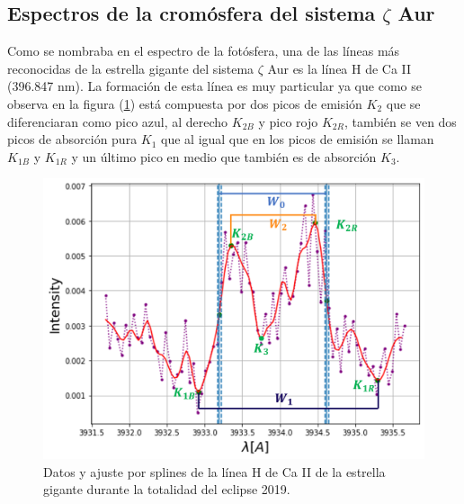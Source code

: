\documentclass[12pt,oneside,openany,letter]{book}
\begin{document}

\subsection*{Espectros de la cromósfera del  sistema $\zeta$ Aur}

\noindent Como se nombraba en el espectro de la fotósfera, una de las líneas más reconocidas de la estrella gigante del sistema $\zeta$ Aur es la línea H de Ca II (396.847 nm). La formación de esta línea es muy particular ya que como se observa en la figura (\ref{fig:lineaCaii}) está compuesta por dos picos de emisión $K_2$ que se diferenciaran como pico azul, al derecho $K_{2B}$ y pico rojo $K_{2R}$, también se ven dos picos de absorción pura $K_1$ que al igual que en los picos de emisión se llaman $K_{1B}$ y $K_{1R}$ y un último pico en medio que también es de absorción $K_3$.

\begin{figure}[h]
    \centering
    \includegraphics[width=0.8\linewidth]{Images/lineaCaii.png}
    \caption{Datos y ajuste por splines de la línea H de Ca II de la estrella gigante durante la totalidad del eclipse 2019.}
    \label{fig:lineaCaii}
\end{figure}
\end{document}

